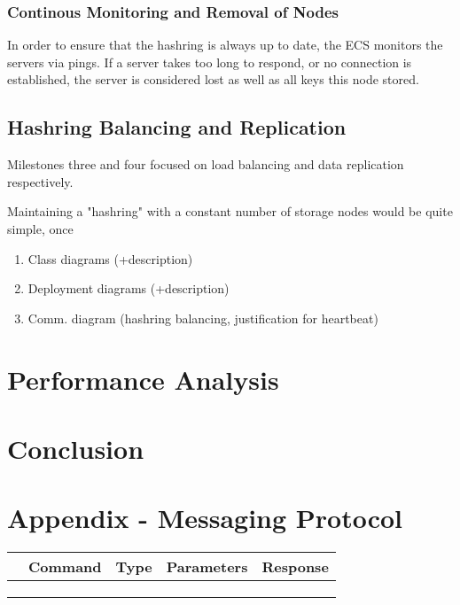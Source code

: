 \documentclass[sigconf]{acmart}
\begin{document}
\subsubsection{Continous Monitoring and Removal of Nodes}
In order to ensure that the hashring is always up to date, the ECS monitors the servers via pings. If a server takes too long to respond, or no connection is established, the server is considered lost as well as all keys this node stored.

\subsection{Hashring Balancing and Replication}
Milestones three and four focused on load balancing and data replication respectively.

Maintaining a "hashring" with a constant number of storage nodes would be quite simple, once 
\begin{enumerate}
  \item Class diagrams (+description)
  \item Deployment diagrams (+description)
  \item Comm. diagram (hashring balancing, justification for heartbeat)
\end{enumerate}

\section{Performance Analysis}\label{performance-analysis}
\section{Conclusion}
\section{Appendix - Messaging Protocol}
  \begin{tabular}{|l|l|l|l|l|}
  \hline
   & Command & Type & Parameters & Response \\ \hline
  \hline
   &  &  &  &  \\ \hline
   &  &  &  &  \\ \hline
   &  &  &  &  \\ \hline
  \end{tabular}
\end{document}
